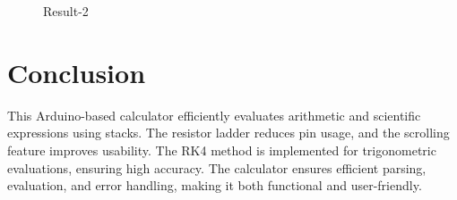 \documentclass{article}
\begin{document}
\begin{figure}[h!]
	\centering
	\caption{Result-2}
\end{figure}
\pagebreak

\section{Conclusion}
This Arduino-based calculator efficiently evaluates arithmetic and scientific expressions using stacks. The resistor ladder reduces pin usage, and the scrolling feature improves usability. The RK4 method is implemented for trigonometric evaluations, ensuring high accuracy. The calculator ensures efficient parsing, evaluation, and error handling, making it both functional and user-friendly.
\end{document}
